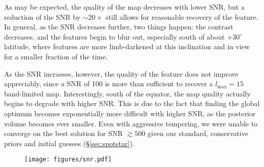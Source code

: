 \documentclass[modern]{aastex62}
\begin{document}
As may be expected, the quality of the map decreases with lower SNR, but
a reduction of the SNR by $\sim 20\times$ still allows for reasonable
recovery of the \spot feature. In general, as the SNR decreases further, 
two things happen: the \spot contrast decreases, and the features begin to
blur out, especially south of about $+30^\circ$ latitude, where features 
are more limb-darkened
at this inclination and in view for a smaller fraction of the time.

As the SNR incraeses, however, the quality of the \spot feature does not
improve appreciably, since a SNR of 100 is more than sufficient to recover 
a $l_\mathrm{max} = 15$ band-limited map. Interestingly, south of the equator,
the map quality actually begins to degrade with higher SNR. This is due to
the fact that finding the global optimum becomes exponentially more difficult
with higher SNR, as the posterior volume becomes ever smaller. Even with
aggressive tempering, we were unable to converge on the best solution for
SNR $\gtrsim 500$ given our standard, conservative priors and initial
guesses (\S\ref{sec:spotstar}).
%
\begin{figure}[p!]
    \begin{centering}
    \texttt{[image: figures/snr.pdf]}
    \end{centering}
\end{figure}
%
\end{document}
